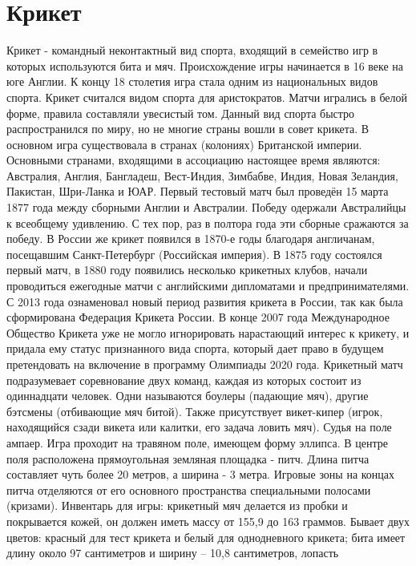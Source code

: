\section{Крикет}

Крикет - командный неконтактный вид спорта, входящий в семейство игр в которых используются бита и мяч. Происхождение игры начинается в 16 веке на юге Англии. К концу 18 столетия игра стала одним из
национальных видов спорта. Крикет считался видом спорта для аристократов. Матчи игрались в белой форме, правила составляли увесистый том.
Данный вид спорта быстро распространился по миру, но не многие
страны вошли в совет крикета. В основном игра существовала в странах
(колониях) Британской империи.
Основными странами, входящими в ассоциацию настоящее время
являются: Австралия, Англия, Бангладеш, Вест-Индия, Зимбабве, Индия,
Новая Зеландия, Пакистан, Шри-Ланка и ЮАР.
Первый тестовый матч был проведён 15 марта 1877 года между
сборными Англии и Австралии. Победу одержали Австралийцы к всеобщему удивлению. С тех пор, раз в полтора года эти сборные сражаются за
победу.
В России же крикет появился в 1870-е годы благодаря англичанам,
посещавшим Санкт-Петербург (Российская империя). В 1875 году состоялся первый матч, в 1880 году появились несколько крикетных клубов,
начали проводиться ежегодные матчи с английскими дипломатами и предпринимателями. С 2013 года ознаменовал новый период развития крикета
в России, так как была сформирована Федерация Крикета России. В конце
2007 года Международное Общество Крикета уже не могло игнорировать
нарастающий интерес к крикету, и придала ему статус признанного вида
спорта, который дает право в будущем претендовать на включение в программу Олимпиады 2020 года.
Крикетный матч подразумевает соревнование двух команд, каждая
из которых состоит из одиннадцати человек. Одни называются боулеры
(падающие мяч), другие бэтсмены (отбивающие мяч битой). Также присутствует викет-кипер (игрок, находящийся сзади викета или калитки, его
задача ловить мяч). Судья на поле ампаер.
Игра проходит на травяном поле, имеющем форму эллипса. В центре
поля расположена прямоугольная земляная площадка - питч. Длина питча
составляет чуть более 20 метров, а ширина - 3 метра. Игровые зоны на
концах питча отделяются от его основного пространства специальными
полосами (кризами).
Инвентарь для игры: крикетный мяч делается из пробки и покрывается кожей, он должен иметь массу от 155,9 до 163 граммов. Бывает двух
цветов: красный для тест крикета и белый для однодневного крикета; бита 
имеет длину около 97 сантиметров и ширину – 10,8 сантиметров, лопасть
